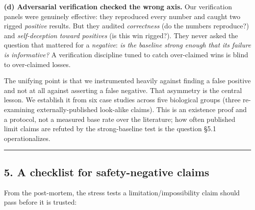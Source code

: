 \textbf{(d) Adversarial verification checked the wrong axis.} Our
verification panels were genuinely effective: they reproduced every
number and caught two rigged \emph{positive} results. But they audited
\emph{correctness} (do the numbers reproduce?) and \emph{self-deception
toward positives} (is this win rigged?). They never asked the question
that mattered for a \emph{negative}: \emph{is the baseline strong enough
that its failure is informative?} A verification discipline tuned to
catch over-claimed wins is blind to over-claimed losses.

The unifying point is that we instrumented heavily against finding a
false positive and not at all against asserting a false negative. That
asymmetry is the central lesson. We establish it from six case studies
across five biological groups (three re-examining externally-published
look-alike claims). This is an existence proof and a protocol, not a
measured base rate over the literature; how often published limit claims
are refuted by the strong-baseline test is the question §5.1
operationalizes.

\begin{center}\rule{0.5\linewidth}{0.5pt}\end{center}

\subsection{5. A checklist for safety-negative
claims}\label{a-checklist-for-safety-negative-claims}

From the post-mortem, the stress tests a limitation/impossibility claim
should pass before it is trusted:

